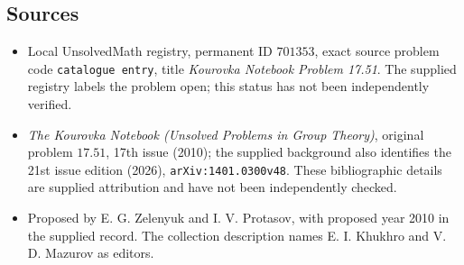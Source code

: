 \documentclass[11pt]{article}
\begin{document}
\subsection{Sources}
\begin{itemize}
\item Local UnsolvedMath registry, permanent ID \(701353\), exact source problem code \texttt{catalogue entry}, title \emph{Kourovka Notebook Problem 17.51}. The supplied registry labels the problem open; this status has not been independently verified.
\item \emph{The Kourovka Notebook (Unsolved Problems in Group Theory)}, original problem \(17.51\), 17th issue (2010); the supplied background also identifies the 21st issue edition (2026), \texttt{arXiv:1401.0300v48}. These bibliographic details are supplied attribution and have not been independently checked.
\item Proposed by E. G. Zelenyuk and I. V. Protasov, with proposed year 2010 in the supplied record. The collection description names E. I. Khukhro and V. D. Mazurov as editors.
\end{itemize}
\end{document}
